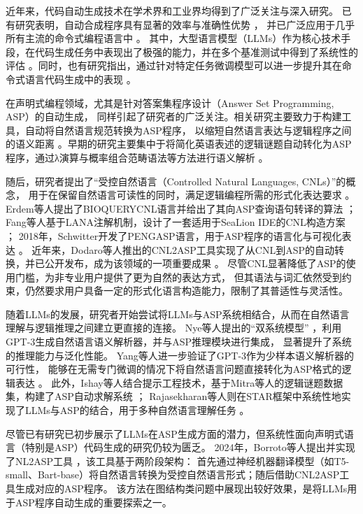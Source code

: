 近年来，代码自动生成技术在学术界和工业界均得到了广泛关注与深入研究。
已有研究表明，自动合成程序具有显著的效率与准确性优势 \cite{ernst2022ai}\cite{peng2023impact}\cite{dakhel2023github}，
并已广泛应用于几乎所有主流的命令式编程语言中 \cite{chen2021evaluating}。
其中，大型语言模型（LLMs）作为核心技术手段，在代码生成任务中表现出了极强的能力，并在多个基准测试中得到了系统性的评估 \cite{xu2022systematic}\cite{wang2023codet5+}。同时，也有研究指出，通过针对特定任务微调模型可以进一步提升其在命令式语言代码生成中的表现 \cite{ma2024llamoco}。

在声明式编程领域，尤其是针对答案集程序设计（Answer Set Programming, ASP）的自动生成，
同样引起了研究者的广泛关注。相关研究主要致力于构建工具，自动将自然语言规范转换为ASP程序，
以缩短自然语言表达与逻辑程序之间的语义距离 \cite{erdem2009transforming}\cite{fang2017approach}\cite{schwitter2018specifying}\cite{caruso2024cnl2asp}。早期的研究主要集中于将简化英语表述的逻辑谜题自动转化为ASP程序，通过λ演算与概率组合范畴语法等方法进行语义解析 \cite{baral2012solving}。

随后，研究者提出了“受控自然语言（Controlled Natural Languages, CNLs）”的概念，
用于在保留自然语言可读性的同时，满足逻辑编程所需的形式化表达要求 \cite{kuhn2014survey}。
Erdem等人提出了BIOQUERYCNL语言并给出了其向ASP查询语句转译的算法 \cite{erdem2009transforming}；
Fang等人基于LANA注解机制，设计了一套适用于SeaLion IDE的CNL构造方案 \cite{fang2017approach}；
2018年，Schwitter开发了PENGASP语言，用于ASP程序的语言化与可视化表达 \cite{schwitter2018specifying}。
近年来，Dodaro等人推出的CNL2ASP工具实现了从CNL到ASP的自动转换，并已公开发布，成为该领域的一项重要成果 \cite{caruso2024cnl2asp}。
尽管CNL显著降低了ASP的使用门槛，为非专业用户提供了更为自然的表达方式，
但其语法与词汇依然受到约束，仍然要求用户具备一定的形式化语言构造能力，限制了其普适性与灵活性。

随着LLMs的发展，研究者开始尝试将LLMs与ASP系统相结合，从而在自然语言理解与逻辑推理之间建立更直接的连接。
Nye等人提出的“双系统模型” \cite{nye2021improving}，利用GPT-3生成自然语言语义解析器，并与ASP推理模块进行集成，
显著提升了系统的推理能力与泛化性能。
Yang等人进一步验证了GPT-3作为少样本语义解析器的可行性，
能够在无需专门微调的情况下将自然语言问题直接转化为ASP格式的逻辑表达 \cite{yang2023coupling}。
此外，Ishay等人结合提示工程技术，基于Mitra等人的逻辑谜题数据集，构建了ASP自动求解系统 \cite{mitra2016addressing}；
Rajasekharan等人则在STAR框架中系统性地实现了LLMs与ASP的结合，用于多种自然语言理解任务 \cite{rajasekharan2023reliable}。

尽管已有研究已初步展示了LLMs在ASP生成方面的潜力，但系统性面向声明式语言（特别是ASP）代码生成的研究仍较为匮乏。
2024年，Borroto等人提出并实现了NL2ASP工具 \cite{borroto2024automaticcompositionaspprograms}，该工具基于两阶段架构：
首先通过神经机器翻译模型（如T5-small、Bart-base）将自然语言转换为受控自然语言形式；随后借助CNL2ASP工具生成对应的ASP程序。
该方法在图结构类问题中展现出较好效果，是将LLMs用于ASP程序自动生成的重要探索之一。

